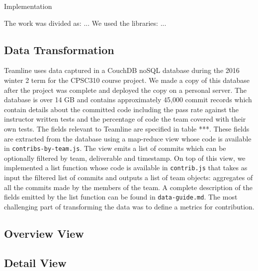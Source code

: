 \documentclass[../manifest.tex]{subfiles}
\begin{document}
Implementation

The work was divided as: ...
We used the libraries: ...

\subsection{Data Transformation}
Teamline uses data captured in a CouchDB noSQL database during the 2016 winter 2 term for the CPSC310 course project. We made a copy of this database after the project was complete and deployed the copy on a personal server. The database is over 14 GB and contains approximately 45,000 commit records which contain details about the committed code including the pass rate against the instructor written tests and the percentage of code the team covered with their own tests. The fields relevant to Teamline are specified in table ***. These fields are extracted from the database using a map-reduce view whose code is available in \texttt{contribs-by-team.js}. The view emits a list of commits which can be optionally filtered by team, deliverable and timestamp. On top of this view, we implemented a list function whose code is available in \texttt{contrib.js} that takes as input the filtered list of commits and outputs a list of team objects: aggregates of all the commits made by the members of the team. A complete description of the fields emitted by the list function can be found in \texttt{data-guide.md}. The most challenging part of transforming the data was to define a metrics for contribution.

\subsection{Overview View}
\subsection{Detail View}
\end{document}
